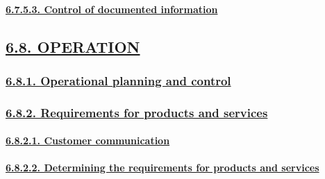 \documentclass[
]{article}
\begin{document}
\hypertarget{control-of-documented-information}{%
\paragraph{\texorpdfstring{\protect\hyperlink{control-of-documented-information-1}{6.7.5.3.
Control of documented
information}}{6.7.5.3. Control of documented information}}\label{control-of-documented-information}}

\hypertarget{operation}{%
\subsection{\texorpdfstring{\protect\hyperlink{operation-1}{6.8.
OPERATION}}{6.8. OPERATION}}\label{operation}}

\hypertarget{operational-planning-and-control}{%
\subsubsection{\texorpdfstring{\protect\hyperlink{operational-planning-and-control-1}{6.8.1.
Operational planning and
control}}{6.8.1. Operational planning and control}}\label{operational-planning-and-control}}

\hypertarget{requirements-for-products-and-services}{%
\subsubsection{\texorpdfstring{\protect\hyperlink{requirements-for-products-and-services-1}{6.8.2.
Requirements for products and
services}}{6.8.2. Requirements for products and services}}\label{requirements-for-products-and-services}}

\hypertarget{customer-communication}{%
\paragraph{\texorpdfstring{\protect\hyperlink{customer-communication-1}{6.8.2.1.
Customer
communication}}{6.8.2.1. Customer communication}}\label{customer-communication}}

\hypertarget{determining-the-requirements-for-products-and-services}{%
\paragraph{\texorpdfstring{\protect\hyperlink{determining-the-requirements-for-products-and-services-1}{6.8.2.2.
Determining the requirements for products and
services}}{6.8.2.2. Determining the requirements for products and services}}\label{determining-the-requirements-for-products-and-services}}
\end{document}
